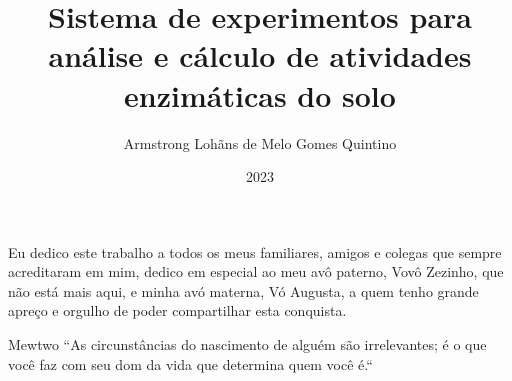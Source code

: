 \documentclass[pt,oneside,onehalfspacing,bsc]{risethesis}
\title{Sistema de experimentos para análise e cálculo de atividades enzimáticas do solo}
\date{2023}
\author{Armstrong Lohãns de Melo Gomes Quintino}
\begin{document}
\frontmatter

\frontpage

\presentationpage

\begin{fichacatalografica}
	\FakeFichaCatalografica %
\end{fichacatalografica}

\banca


\begin{dedicatory}
Eu dedico este trabalho a todos os meus familiares, amigos e colegas que sempre acreditaram em mim, dedico em especial ao meu avô paterno, Vovô Zezinho, que não está mais aqui, e minha avó materna, Vó Augusta, a quem tenho grande apreço e orgulho de poder compartilhar esta conquista.
\end{dedicatory}

\acknowledgements


\begin{epigraph}[]{ Mewtwo}
``As circunstâncias do nascimento de alguém são irrelevantes; é o que você faz com seu dom da vida que determina quem você é.``
\end{epigraph}

\resumo


\abstract


\listoffigures

\listoftables

\listofacronyms


\tableofcontents

\mainmatter









\begin{references}
  
\end{references}


\theappendix\label{appendix}


\end{document}
